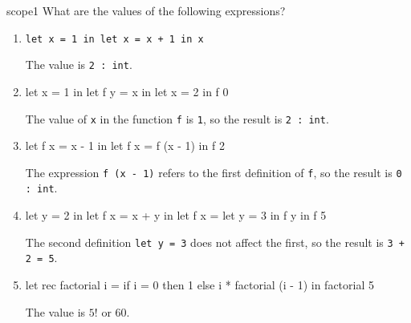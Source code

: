 %
\begin{exercise}{scope1}
What are the values of the following expressions?

\begin{enumerate}
\item \lstinline!let x = 1 in let x = x + 1 in x!

\begin{answer}\ifanswers
The value is \hbox{\lstinline/2 : int/}.
\fi\end{answer}

\item

\begin{ocamllistinge}
let x = 1 in
let f y = x in
let x = 2 in
f 0
\end{ocamllistinge}

\begin{answer}\ifanswers
The value of \hbox{\lstinline/x/} in the function \hbox{\lstinline/f/} is \hbox{\lstinline/1/}, so the result is \hbox{\lstinline/2 : int/}.
\fi\end{answer}

\item

\begin{ocamllistinge}
let f x = x - 1 in
let f x = f (x - 1) in
f 2
\end{ocamllistinge}

\begin{answer}\ifanswers
The expression \hbox{\lstinline/f (x - 1)/} refers to the first definition of \hbox{\lstinline/f/}, so the result is \hbox{\lstinline/0 : int/}.
\fi\end{answer}

\item

\begin{ocamllistinge}
let y = 2 in
let f x = x + y in
let f x = let y = 3 in f y in
f 5
\end{ocamllistinge}

\begin{answer}\ifanswers
The second definition \hbox{\lstinline/let y = 3/} does not affect the first, so the result is \hbox{\lstinline/3 + 2 = 5/}.
\fi\end{answer}

\item

\begin{ocamllistinge}
let rec factorial i =
   if i = 0 then 1 else i * factorial (i - 1)
in
   factorial 5
\end{ocamllistinge}

\begin{answer}\ifanswers
The value is $5!$ or $60$.
\fi\end{answer}
\end{enumerate}
\end{exercise}

